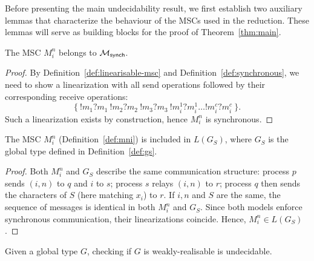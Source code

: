 Before presenting the main undecidability result, we first establish two
auxiliary lemmas that characterize the behaviour of the MSCs used in the
reduction. These lemmas will serve as building blocks for the proof of
Theorem~\ref{thm:main}.

\bigskip

\begin{lemma}\label{lemma:minsynch}
	The MSC $M_i^n$ belongs to $\mathcal{M}_{\mathsf{synch}}$.
\end{lemma}

\begin{proof}
	By Definition~\ref{def:linearisable-msc} and
	Definition~\ref{def:synchronous},
	we need to show a linearization with all send operations
	followed by their corresponding receive operations:
	$$
		\{~!m_1?m_1\ !m_2?m_2\ !m_3?m_3\ !m_i^1?m_i^1 \ldots !m_i^c?m_i^c~\}.
	$$
	Such a linearization exists by construction, hence $M_i^n$ is synchronous.
\end{proof}

\bigskip

\begin{lemma}\label{lemma:msgs}
	The MSC $M^n_i$ (Definition~\ref{def:mni}) is included in $L(G_S)$, where $G_S$
	is the global type defined in Definition~\ref{def:gs}.
\end{lemma}

\begin{proof}
	Both $M^n_i$ and $G_S$ describe the same communication structure:
	process $p$ sends $(i,n)$ to $q$ and $i$ to $s$;
	process $s$ relays $(i,n)$ to $r$;
	process $q$ then sends the characters of $S$ (here matching $x_i$) to $r$.
	If $i,n$ and $S$ are the same, the sequence of messages is identical in both 
	$M^n_i$ and $G_S$. Since both models enforce synchronous communication, 
	their linearizations coincide. Hence, $M^n_i \in L(G_S)$.
\end{proof}

\bigskip

\begin{theorem}\label{thm:main}
	Given a global type $G$, checking if $G$ is weakly-realisable is undecidable.
\end{theorem}

